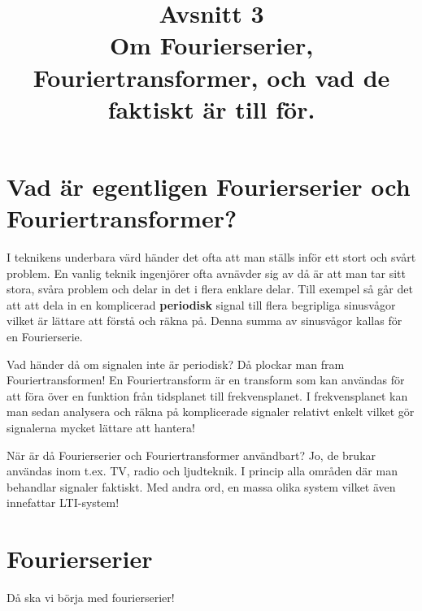 \documentclass{article}
\title{Avsnitt 3 \\
\large Om Fourierserier, Fouriertransformer, och vad de faktiskt är till för.}
\author{ }
\date{}
\begin{document}
\maketitle

\section{Vad är egentligen Fourierserier och Fouriertransformer?}
I teknikens underbara värd händer det ofta att man ställs inför ett stort och svårt problem. En vanlig teknik ingenjörer ofta avnävder sig av då är att man tar sitt stora, svåra problem och delar in det i flera enklare delar. Till exempel så går det att att  dela in en komplicerad \textbf{periodisk} signal till flera begripliga sinusvågor vilket är lättare att förstå och räkna på. Denna summa av sinusvågor kallas för en Fourierserie. 

Vad händer då om signalen inte är periodisk? Då plockar man fram Fouriertransformen! En Fouriertransform är en transform som kan användas för att föra över en funktion från tidsplanet till frekvensplanet. I frekvensplanet kan man sedan analysera och räkna på komplicerade signaler relativt enkelt vilket gör signalerna mycket lättare att hantera! 

När är då Fourierserier och Fouriertransformer användbart? Jo, de brukar användas inom t.ex. TV, radio och ljudteknik. I princip alla områden där man behandlar signaler faktiskt. Med andra ord, en massa olika system vilket även innefattar LTI-system!

\section{Fourierserier}

Då ska vi börja med fourierserier!
\end{document}
